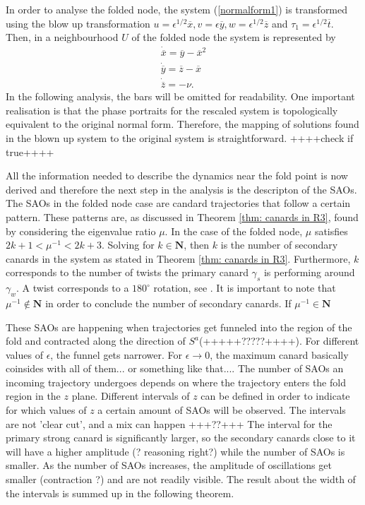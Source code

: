 In order to analyse the folded node, the system (\ref{normalform1}) is transformed using the blow up transformation $u= \epsilon^{1/2}\overline{x}, v=\epsilon \overline{y}, w= \epsilon^{1/2} \overline{z}$ and $ \tau_1 = \epsilon^{1/2} \overline{t}$.
Then, in a neighbourhood $U$ of the folded node the system is represented by
\begin{align*}
\dot{\overline{x}}= \overline{y} - \overline{x}^2\\
\dot{\overline{y}}=\overline{z} - \overline{x} \\
\dot{\overline{z}}= - \nu.
\end{align*}
In the following analysis, the bars will be omitted for readability.
One important realisation is that the phase portraits for the rescaled system is topologically equivalent to the original normal form. Therefore, the mapping of solutions  found in the blown up system to the original system is straightforward. ++++check if true++++

All the information needed to describe the dynamics near the fold point is now derived and therefore the next step in the analysis is the descripton of the SAOs. The SAOs in the folded node case are candard trajectories that follow a certain pattern.
These patterns are, as discussed in Theorem \ref{thm: canards in R3}, found by considering the eigenvalue ratio $\mu$.
In the case of the folded node, $\mu$ satisfies $2k+1 < \mu^{-1} < 2k +3 $. Solving for $k \in \mathbf{N}$, then $k$ is the number of secondary canards in the system as stated in Theorem \ref{thm: canards in R3}. Furthermore, $k$ corresponds to the number of twists the primary canard $\gamma_s$ is performing around $\gamma_w$. A twist corresponds to a $180^{\circ}$ rotation, see \citet{kuehn}. It is important to note that $\mu^{-1} \notin \mathbf{N}$ in order to conclude the number of secondary canards.
If $\mu^{-1} \in \mathbf{N}$ 

These SAOs are happening when trajectories get funneled into the region of the fold and contracted along the direction of $S^a$(+++++?????++++). For different values of $\epsilon$, the funnel gets narrower. For $\epsilon \to 0$, the maximum canard basically coinsides with all of them... or something like that....
The number of SAOs an incoming trajectory undergoes depends on where the trajectory enters the fold region in the $z$ plane. Different intervals of $z$ can be defined in order to indicate for which values of $z$ a certain amount of SAOs will be observed. The intervals are not 'clear cut', and a mix can happen +++??+++
The interval for the primary strong canard is significantly larger, so the secondary canards close to it will have a higher amplitude (? reasoning right?) while the number of SAOs is smaller. As the number of SAOs increases, the amplitude of oscillations get smaller (contraction ?) and are not readily visible.
The result about the width of the intervals is summed up in the following theorem.

